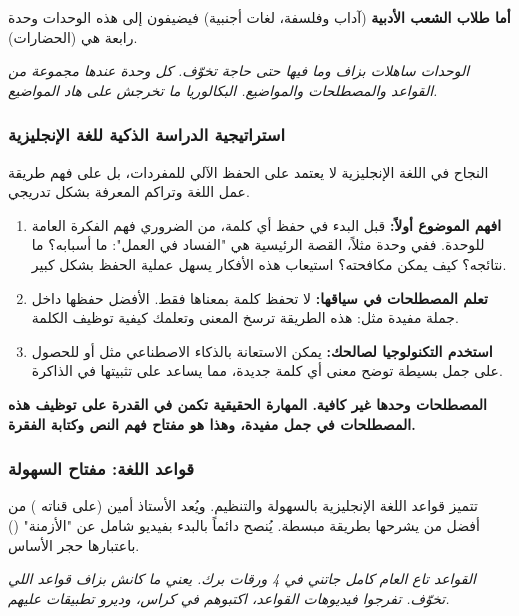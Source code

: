 \documentclass[12pt,a4paper]{book}
\newcommand{\quoteAr}[1]{%
	\begin{myquote}
		\itshape #1
	\end{myquote}
}
\newcommand{\importantAr}[1]{%
	\begin{important}
		\bfseries #1
	\end{important}
}
\begin{document}
	\textbf{أما طلاب الشعب الأدبية} (آداب وفلسفة، لغات أجنبية) فيضيفون إلى هذه الوحدات وحدة رابعة هي  (الحضارات).
	
	\quoteAr{الوحدات ساهلات بزاف وما فيها حتى حاجة تخوّف. كل وحدة عندها مجموعة من القواعد والمصطلحات والمواضيع. البكالوريا ما تخرجش على هاد المواضيع.}
	
	\subsubsection{استراتيجية الدراسة الذكية للغة الإنجليزية}
	
	النجاح في اللغة الإنجليزية لا يعتمد على الحفظ الآلي للمفردات، بل على فهم طريقة عمل اللغة وتراكم المعرفة بشكل تدريجي.
	
	\begin{enumerate}
		\item \textbf{افهم الموضوع أولاً:} قبل البدء في حفظ أي كلمة، من الضروري فهم الفكرة العامة للوحدة. ففي وحدة  مثلاً، القصة الرئيسية هي "الفساد في العمل": ما أسبابه؟ ما نتائجه؟ كيف يمكن مكافحته؟ استيعاب هذه الأفكار يسهل عملية الحفظ بشكل كبير.
		\item \textbf{تعلم المصطلحات في سياقها:} لا تحفظ كلمة    بمعناها فقط. الأفضل حفظها داخل جملة مفيدة مثل: \newline {}\newline هذه الطريقة ترسخ المعنى وتعلمك كيفية توظيف الكلمة.
		\item \textbf{استخدم التكنولوجيا لصالحك:} يمكن الاستعانة بالذكاء الاصطناعي مثل  أو  للحصول على جمل بسيطة توضح معنى أي كلمة جديدة، مما يساعد على تثبيتها في الذاكرة.
	\end{enumerate}
	
	\importantAr{المصطلحات وحدها غير كافية. المهارة الحقيقية تكمن في القدرة على توظيف هذه المصطلحات في جمل مفيدة، وهذا هو مفتاح فهم النص وكتابة الفقرة.}
	
	\subsubsection{قواعد اللغة: مفتاح السهولة}
	
	تتميز قواعد اللغة الإنجليزية بالسهولة والتنظيم. ويُعد الأستاذ أمين (على قناته ) من أفضل من يشرحها بطريقة مبسطة. يُنصح دائماً بالبدء بفيديو شامل عن "الأزمنة" () باعتبارها حجر الأساس.
	
	\quoteAr{القواعد تاع العام كامل جاتني في 4 ورقات برك. يعني ما كانش بزاف قواعد اللي تخوّف. تفرجوا فيديوهات القواعد، اكتبوهم في كراس، وديرو تطبيقات عليهم.}
	
\end{document}
